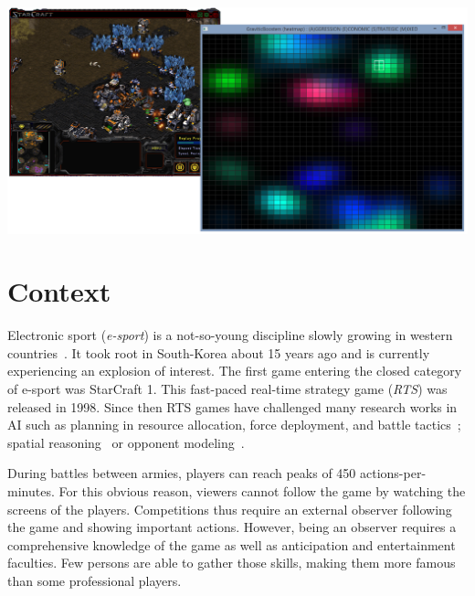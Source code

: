 \documentclass{jfsma}
\begin{document}
\maketitle

\begin{strip}
  \centering\noindent
  \includegraphics[scale=0.28]{gfx/GB}
  \vspace{0.3cm}
\end{strip}

	\section{Context}
    Electronic sport (\textit{e-sport}) is a not-so-young discipline slowly growing in western countries~\cite{taylor2012raising}.
    It took root in South-Korea about 15 years ago and is currently experiencing an explosion of interest.
    The first game entering the closed category of e-sport was StarCraft 1. %
    This fast-paced real-time strategy game (\textit{RTS}) was released in 1998.
    Since then RTS games have challenged many research works in AI such as planning in resource allocation, force deployment, and battle tactics~\cite{weber2009case,mccoy2008integrated}; spatial reasoning~\cite{forbus2002qualitative} or opponent modeling~\cite{schadd2007opponent}.

    During battles between armies, players can reach peaks of 450 actions-per-minutes.
    For this obvious reason, viewers cannot follow the game by watching the screens of the players.
    Competitions thus require an external observer following the game and showing important actions.
    However, being an observer requires a comprehensive knowledge of the game as well as anticipation and entertainment faculties.
    Few persons are able to gather those skills, making them more famous than some professional players.
\end{document}
